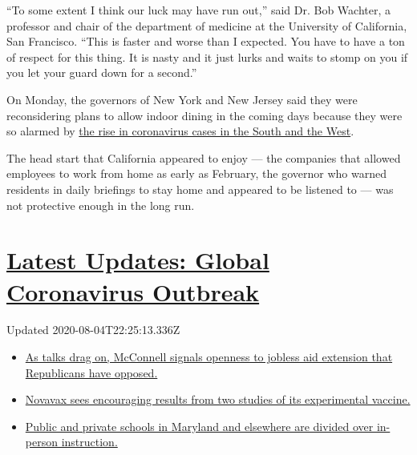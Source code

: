 ``To some extent I think our luck may have run out,'' said Dr. Bob
Wachter, a professor and chair of the department of medicine at the
University of California, San Francisco. ``This is faster and worse than
I expected. You have to have a ton of respect for this thing. It is
nasty and it just lurks and waits to stomp on you if you let your guard
down for a second.''

On Monday, the governors of New York and New Jersey said they were
reconsidering plans to allow indoor dining in the coming days because
they were so alarmed by
\href{https://www.nytimes.com/2020/06/14/us/coronavirus-united-states.html}{the
rise in coronavirus cases in the South and the West}.

The head start that California appeared to enjoy --- the companies that
allowed employees to work from home as early as February, the governor
who warned residents in daily briefings to stay home and appeared to be
listened to --- was not protective enough in the long run.

\hypertarget{latest-updates-global-coronavirus-outbreak}{%
\section{\texorpdfstring{\href{https://www.nytimes.com/2020/08/04/world/coronavirus-cases.html?action=click\&pgtype=Article\&state=default\&region=MAIN_CONTENT_1\&context=storylines_live_updates}{Latest
Updates: Global Coronavirus
Outbreak}}{Latest Updates: Global Coronavirus Outbreak}}\label{latest-updates-global-coronavirus-outbreak}}

Updated 2020-08-04T22:25:13.336Z

\begin{itemize}
\tightlist
\item
  \href{https://www.nytimes.com/2020/08/04/world/coronavirus-cases.html?action=click\&pgtype=Article\&state=default\&region=MAIN_CONTENT_1\&context=storylines_live_updates\#link-2daa96b5}{As
  talks drag on, McConnell signals openness to jobless aid extension
  that Republicans have opposed.}
\item
  \href{https://www.nytimes.com/2020/08/04/world/coronavirus-cases.html?action=click\&pgtype=Article\&state=default\&region=MAIN_CONTENT_1\&context=storylines_live_updates\#link-1228a480}{Novavax
  sees encouraging results from two studies of its experimental
  vaccine.}
\item
  \href{https://www.nytimes.com/2020/08/04/world/coronavirus-cases.html?action=click\&pgtype=Article\&state=default\&region=MAIN_CONTENT_1\&context=storylines_live_updates\#link-4825b93}{Public
  and private schools in Maryland and elsewhere are divided over
  in-person instruction.}
\end{itemize}


